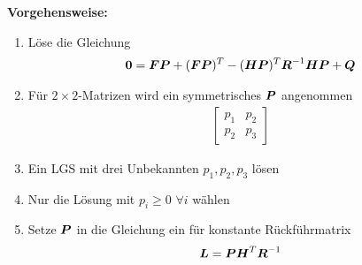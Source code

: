 \begin{tcolorbox}[colback=white!10!white,colframe=green!30!black]
    \tcblower
    \textbf{Vorgehensweise:}
    \begin{enumerate}
        \item Löse die Gleichung\begin{align*}
            \boldsymbol{0} = \boldsymbol{FP} + (\boldsymbol{FP})^T -(\boldsymbol{HP})^T\boldsymbol{R}^{-1}\boldsymbol{HP} +\boldsymbol{Q}
        \end{align*}
        \item Für $2\times2$-Matrizen wird ein symmetrisches $\boldsymbol{P}$ angenommen\begin{align*}
            \begin{bmatrix}
            p_1 & p_2 \\ p_2 & p_3
            \end{bmatrix}
        \end{align*}
            \item Ein LGS mit drei Unbekannten $p_1,p_2,p_3$ lösen 
            \item Nur die Lösung mit $p_i\geq 0$   $\forall i$ wählen
            \item Setze $\boldsymbol{P}$ in die Gleichung ein für konstante Rückführmatrix
             \begin{align*}
                \boldsymbol{L} = \boldsymbol{PH}^T\boldsymbol{R}^{-1}
            \end{align*} 
    \end{enumerate}
    
    
\end{tcolorbox}
